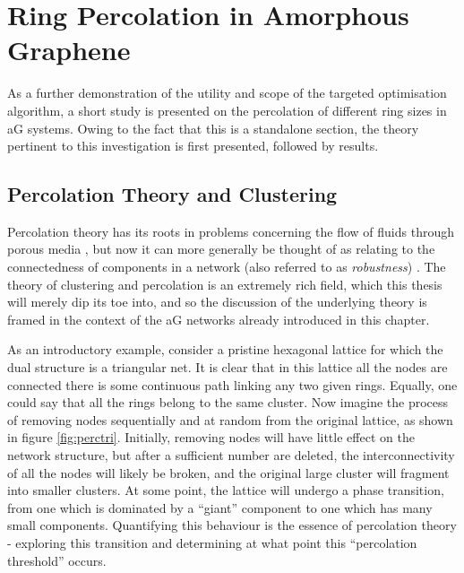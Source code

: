 \section{Ring Percolation in Amorphous Graphene}

As a further demonstration of the utility and scope of the targeted optimisation algorithm, a short study is presented on the percolation of different ring sizes in aG systems.
Owing to the fact that this is a standalone section, the theory pertinent to this investigation is first presented, followed by results.

\subsection{Percolation Theory and Clustering}
\label{s:percolationtheory}

Percolation theory has its roots in problems concerning the flow of fluids through porous media \cite{Broadbent1956}, but now it can more generally be thought of as relating to the connectedness of components in a network (also referred to as \textit{robustness}) \cite{Callaway2000}.
The theory of clustering and percolation is an extremely rich field, which this thesis will merely dip its toe into, and so the discussion of the underlying theory is framed in the context of the aG networks already introduced in this chapter.

As an introductory example, consider a pristine hexagonal lattice for which the dual structure is a triangular net.
It is clear that in this lattice all the nodes are connected \ie{} there is some continuous path linking any two given rings.
Equally, one could say that all the rings belong to the same cluster.
Now imagine the process of removing nodes sequentially and at random from the original lattice, as shown in figure \ref{fig:perctri}.
Initially, removing nodes will have little effect on the network structure, but after a sufficient number are deleted, the interconnectivity of all the nodes will likely be broken, and the original large cluster will fragment into smaller clusters.
At some point, the lattice will undergo a phase transition, from one which is dominated by a ``giant'' component to one which has many small components.
Quantifying this behaviour is the essence of percolation theory \-- exploring this transition and determining at what point this ``percolation threshold'' occurs.

